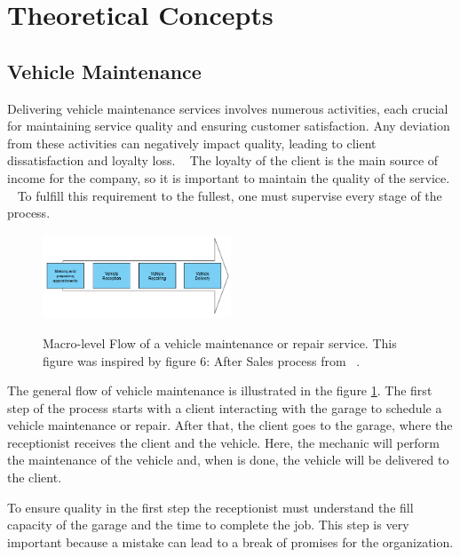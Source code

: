 \section{Theoretical Concepts}

\subsection{Vehicle Maintenance}

Delivering vehicle maintenance services involves numerous activities, each crucial for maintaining service quality and ensuring customer satisfaction. 
Any deviation from these activities can negatively impact quality, leading to client dissatisfaction and loyalty loss. ~\cite{Setting_the_after_sale_process}
The loyalty of the client is the main source of income for the company, so it is important to maintain the quality of the service. ~\cite{Setting_the_after_sale_process}
To fulfill this requirement to the fullest, one must supervise every stage of the process. ~\cite{Setting_the_after_sale_process}


\begin{figure}[h]
  \caption{Macro-level Flow of a vehicle maintenance or repair service. This figure was inspired by figure 6: After Sales process from ~\citet{Setting_the_after_sale_process}.}
  \centering
  \includegraphics[width=0.50\textwidth]{figs/Vehicle_maintenace_macro}
  \label{fig:Vehicle_maintenace_macro}
\end{figure}

The general flow of vehicle maintenance is illustrated in the figure \ref{fig:Vehicle_maintenace_macro}. 
The first step of the process starts with a client interacting with the garage to schedule a vehicle maintenance or repair. 
After that, the client goes to the garage, where the receptionist receives the client and the vehicle.
Here, the mechanic will perform the maintenance of the vehicle and, when is done, the vehicle will be delivered to the client.

To ensure quality in the first step the receptionist must understand the fill capacity of the garage and the time to complete the job. 
This step is very important because a mistake can lead to a break of promises for the organization. ~\cite{Setting_the_after_sale_process}


